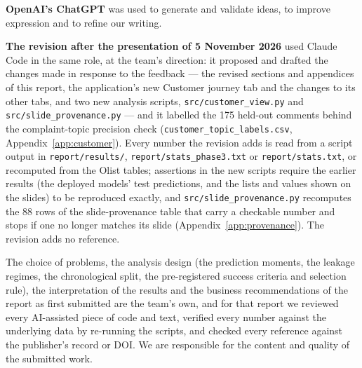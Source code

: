 \documentclass[12pt,a4paper]{article}
\newcommand{\code}[1]{\texttt{\small #1}}
\begin{document}
\textbf{OpenAI's ChatGPT} was used to generate and validate ideas, to improve
expression and to refine our writing.

\textbf{The revision after the presentation of 5 November 2026} used Claude
Code in the same role, at the team's direction: it proposed and drafted the
changes made in response to the feedback --- the revised sections and
appendices of this report, the application's new Customer journey tab and the
changes to its other tabs, and two new analysis scripts,
\code{src/customer\_view.py} and \code{src/slide\_provenance.py} --- and it
labelled the 175 held-out comments behind the complaint-topic precision check
(\code{customer\_topic\_labels.csv}, Appendix~\ref{app:customer}). Every number
the revision adds is read from a script output in \code{report/results/},
\code{report/stats\_phase3.txt} or \code{report/stats.txt}, or recomputed from
the Olist tables; assertions in the new scripts require the earlier
results (the deployed models' test predictions, and the lists and values shown
on the slides) to be reproduced exactly, and
\code{src/slide\_provenance.py} recomputes the 88 rows of the slide-provenance
table that carry a checkable number and stops if one no longer matches its slide
(Appendix~\ref{app:provenance}). The revision adds no reference.

The choice of problems, the analysis design (the prediction moments, the
leakage regimes, the chronological split, the pre-registered success criteria
and selection rule), the interpretation of the results and the business
recommendations of the report as first submitted are the team's own, and for
that report we reviewed every AI-assisted piece of code and text, verified every
number against the underlying data by re-running the scripts, and checked every
reference against the publisher's record or DOI. We are responsible for the
content and quality of the submitted work.
\end{document}
